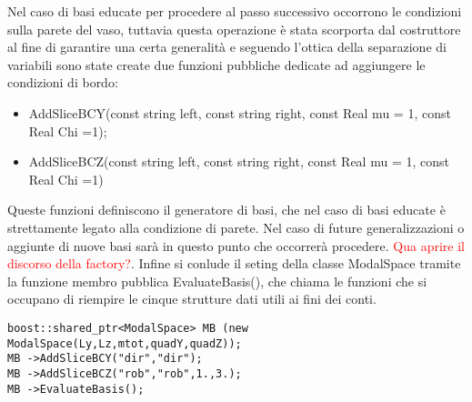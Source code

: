 Nel caso di basi educate per procedere al passo successivo occorrono le condizioni sulla parete del vaso, tuttavia questa operazione \`e stata scorporta dal costruttore al fine di garantire una certa generalit\`a e seguendo l'ottica della separazione di variabili sono state create due funzioni pubbliche dedicate ad aggiungere le condizioni di bordo:
\begin{itemize}
\item AddSliceBCY(const string left, const string right, const Real mu = 1, const Real Chi =1);
\item AddSliceBCZ(const string left, const string right, const Real mu = 1, const Real Chi =1)
\end{itemize}
Queste  funzioni definiscono il generatore di basi, che nel caso di basi educate \`e strettamente legato alla condizione di parete. Nel caso di future generalizzazioni o aggiunte di nuove basi sar\`a in questo punto che occorrer\`a procedere.
\textcolor{red}{Qua aprire il discorso della factory?}.
Infine si conlude il seting della classe ModalSpace tramite la funzione membro pubblica EvaluateBasis(), che chiama le funzioni che si occupano di riempire le cinque strutture dati utili ai fini dei conti.

\begin{lstlisting}[style = general]
boost::shared_ptr<ModalSpace> MB (new ModalSpace(Ly,Lz,mtot,quadY,quadZ));
MB ->AddSliceBCY("dir","dir");
MB ->AddSliceBCZ("rob","rob",1.,3.);
MB ->EvaluateBasis();
\end{lstlisting}


